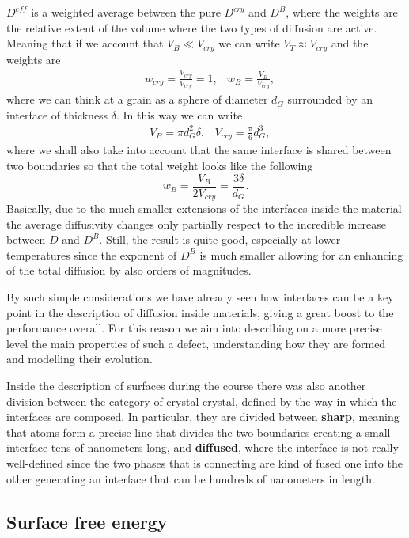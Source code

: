 {
    $D^{eff}$ is a weighted average between the pure $D^{cry}$ and $D^B$, where the weights are the relative extent of the volume where the two types of diffusion are active. Meaning that if we account that $V_B \ll V_{cry}$ we can write $V_T \approx V_{cry}$ and the weights are
    \begin{align}
        &w_{cry} = \frac{V_{cry}}{V_{cry}} = 1, &w_B = \frac{V_B}{V_{cry}},
    \end{align}
    where we can think at a grain as a sphere of diameter $d_G$ surrounded by an interface of thickness $\delta$. In this way we can write
    \begin{align}
        &V_B = \pi d_G^2 \delta, &V_{cry} = \frac{\pi}{6}d_G^3,
    \end{align}
    where we shall also take into account that the same interface is shared between two boundaries so that the total weight looks like the following
    \begin{equation}
        w_B = \frac{V_B}{2V_{cry}} = \frac{3\delta}{d_G}.
    \end{equation}
}
\noindent
Basically, due to the much smaller extensions of the interfaces inside the material the average diffusivity changes only partially respect to the incredible increase between $D$ and $D^B$. Still, the result is quite good, especially at lower temperatures since the exponent of $D^B$ is much smaller allowing for an enhancing of the total diffusion by also orders of magnitudes.

By such simple considerations we have already seen how interfaces can be a key point in the description of diffusion inside materials, giving a great boost to the performance overall. For this reason we aim into describing on a more precise level the main properties of such a defect, understanding how they are formed and modelling their evolution.

\nt
{
    Inside the description of surfaces during the course there was also another division between the category of crystal-crystal, defined by the way in which the interfaces are composed. In particular, they are divided between \textbf{sharp}, meaning that atoms form a precise line that divides the two boundaries creating a small interface tens of nanometers long, and \textbf{diffused}, where the interface is not really well-defined since the two phases that is connecting are kind of fused one into the other generating an interface that can be hundreds of nanometers in length.
}

\subsection{Surface free energy}

